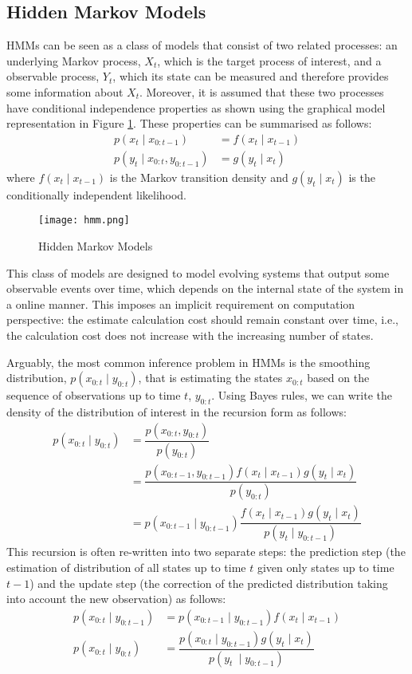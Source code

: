 \subsection{Hidden Markov Models}
HMMs can be seen as a class of models that consist of two related processes: an underlying Markov process, $X_t$, which is the target process of interest, and a observable process, $Y_t$, which its state can be measured and therefore provides some information about $X_t$. Moreover, it is assumed that these two processes have conditional independence properties as shown using the graphical model representation in Figure \ref{fig:HMM}. These properties can be summarised as follows:
\begin{align}
   p(x_t \mid x_{0:t-1}) &= f(x_t \mid x_{t-1})   \nonumber \\
   p(y_t \mid x_{0:t}, y_{0:t-1}) &= g(y_t \mid x_{t}) 
\end{align}
where $f(x_t \mid x_{t-1})$ is the Markov transition density and $g(y_t \mid x_t)$ is the conditionally independent likelihood. 
\begin{figure}
\centering
\texttt{[image: hmm.png]} 
\caption{Hidden Markov Models}
\label{fig:HMM}
\end{figure}

This class of models are designed to model evolving systems that output some observable events over time, which depends on the internal state of the system in a online manner. This imposes an implicit requirement on computation perspective: the estimate calculation cost should remain constant over time, i.e., the calculation cost does not increase with the increasing number of states.

Arguably, the most common inference problem in HMMs is the smoothing distribution, $p(x_{0:t} \mid y_{0:t})$, that is estimating the states $x_{0:t}$ based on the sequence of observations up to time $t$, $y_{0:t}$. Using Bayes rules, we can write the density of the distribution of interest in the recursion form as follows:
\begin{align}
    p(x_{0:t} \mid y_{0:t}) &= \dfrac{p(x_{0:t}, y_{0:t})}{p(y_{0:t})} \nonumber \\
                            &= \dfrac{p(x_{0:t-1}, y_{0:t-1})f(x_t \mid x_{t-1}) g(y_t \mid x_t)}{p(y_{0:t})} \nonumber \\ 
                            &= p(x_{0:t-1} \mid y_{0:t-1})\dfrac{f(x_t \mid x_{t-1}) g(y_t \mid x_t)}{p(y_t \mid y_{0:t-1})} 
\end{align}
This recursion is often re-written into two separate steps: the prediction step (the estimation of distribution of all states up to time $t$ given only states up to time $t-1$) and the update step (the correction of the predicted distribution taking into account the new observation) as follows:
\begin{align}
  p(x_{0:t} \mid y_{0:t-1}) &= p(x_{0:t-1} \mid y_{0:t-1})f(x_t \mid x_{t-1}) \nonumber \\
  p(x_{0:t} \mid y_{0:t})   &= \dfrac{p(x_{0:t} \mid y_{0:t-1}) g(y_t \mid x_t)}{p(y_t\
 \mid y_{0:t-1})}
\end{align}

